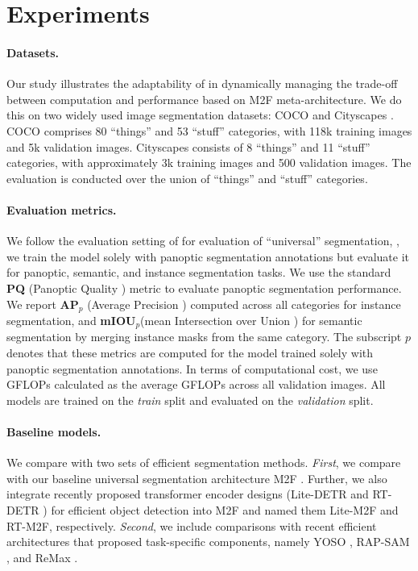 \section{Experiments}
\label{sec:exp}
\paragraph{Datasets.} Our study illustrates the adaptability of {\ours} in dynamically managing the trade-off between computation and performance based on M2F \cite{cheng2021mask2former} meta-architecture. We do this on two widely used image segmentation datasets: COCO \cite{lin2014microsoft} and Cityscapes \cite{cordts2016cityscapes}. COCO comprises 80 ``things'' and 53 ``stuff'' categories, with 118k training images and 5k validation images. Cityscapes consists of 8 ``things'' and 11 ``stuff'' categories, with approximately 3k training images and 500 validation images. The evaluation is conducted over the union of ``things'' and ``stuff'' categories.

\paragraph{Evaluation metrics.}
We follow the evaluation setting of \cite{cheng2021mask2former} for evaluation of ``universal'' segmentation, \ie, we train the model solely with panoptic segmentation annotations but evaluate it for panoptic, semantic, and instance segmentation tasks. We use the standard \textbf{PQ} (Panoptic Quality \cite{kirillov2019panoptic}) metric to evaluate panoptic segmentation performance. We report \textbf{AP}$_p$ (Average Precision \cite{lin2014microsoft}) computed across all categories for instance segmentation, and \textbf{mIOU}$_p$(mean Intersection over Union \cite{everingham2015pascal}) for semantic segmentation by merging instance masks from the same category. The subscript $p$ denotes that these metrics are computed for the model trained solely with panoptic segmentation annotations. In terms of computational cost, we use GFLOPs calculated as the average GFLOPs across all validation images. All models are trained on the \textit{train} split and evaluated on the \textit{validation} split.

\paragraph{Baseline models.} We compare \ours with two sets of efficient segmentation methods. \textit{First}, we compare with our baseline  universal segmentation architecture M2F \cite{cheng2021mask2former}. Further, we also integrate recently proposed transformer encoder designs (Lite-DETR \cite{li2023lite} and RT-DETR \cite{lv2023detrs}) for efficient object detection into M2F and named them Lite-M2F and RT-M2F, respectively. \textit{Second}, we include comparisons with recent efficient architectures that proposed task-specific components, namely YOSO \cite{hu2023you}, RAP-SAM \cite{xu2024rap}, and ReMax \cite{sun2023remax}.

